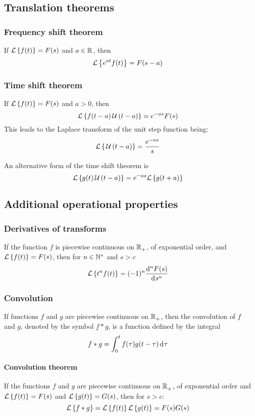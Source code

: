 \documentclass[10pt, twocolumn]{article}
\begin{document}
\subsection{Translation theorems}
\subsubsection{Frequency shift theorem}
If \(\mathcal{L}\left\{ f(t) \right\} = F(s)\) and \(a \in \mathbb{R}_{}^{}\), then
\[
  \mathcal{L}\left\{ e^{at}f(t) \right\} = F(s - a)
\]


\subsubsection{Time shift theorem}
If \(\mathcal{L}\left\{ f(t) \right\} = F(s)\) and \(a > 0\), then
\[
  \mathcal{L}\left\{ f(t - a) \,\mathcal{U}\left( t - a \right) \right\} = e^{-as}F(s)
\]
This leads to the Laplace transform of the unit step function being:
\[
  \mathcal{L}\left\{ \,\mathcal{U}\left( t - a \right) \right\} = \frac{e^{-as}}{s}
\]

An alternative form of the time shift theorem is
\[
  \mathcal{L}\left\{ g(t) \,\mathcal{U}\left( t - a \right) \right\} = e^{-as}\mathcal{L}\left\{ g(t + a) \right\}
\]


\subsection{Additional operational properties}
\subsubsection{Derivatives of transforms}
If the function \(f\) is piecewise continuous on \(\mathbb{R}_{+}^{}\), of exponential order, and \(\mathcal{L}\left\{ f(t) \right\} = F(s)\), then for \(n \in \mathbb{N}_{}^{*}\) and \(s > c\)
\[
  \mathcal{L}\left\{ t^n f(t) \right\} = (-1)^n \frac{\mathrm{d}^{n} F(s)}{\mathrm{d}^{} s^{n}}
\]


\subsubsection{Convolution}
If functions \(f\) and \(g\) are piecewise continuous on \(\mathbb{R}_{+}^{}\), then the convolution of \(f\) and \(g\), denoted by the symbol \(f * g\), is a function defined by the integral
\[
  f * g = \int_0^t{f(\tau) g(t - \tau) \,\mathrm{d}^{} \tau}
\]

\paragraph{Convolution theorem}
If the functions \(f\) and \(g\) are piecewise continuous on \(\mathbb{R}_{+}^{}\), of exponential order and \(\mathcal{L}\left\{ f(t) \right\} = F(s)\) and \(\mathcal{L}\left\{ g(t) \right\} = G(s)\), then for \(s > c\):
\[
  \mathcal{L}\left\{ f * g \right\} = \mathcal{L}\left\{ f(t) \right\} \mathcal{L}\left\{ g(t) \right\} = F(s) G(s)
\]
\end{document}
